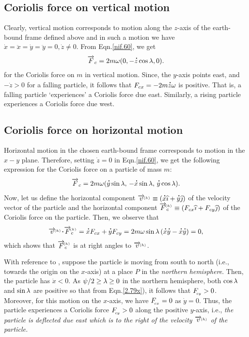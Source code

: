 \subsection{Coriolis force on vertical motion}
 Clearly, 
{vertical motion} corresponds to motion along the $z$-axis 
of the earth-bound frame defined above and in  such a 
motion we have $\dot{x}= \ddot{x}=\dot{y}= \ddot{y}=0, 
\dot{z}\neq 0$. From Eqn.\eqref{nif.60}, we get
\begin{align}
\overrightarrow{F}_{c}=2m{\omega}(0, -{\overset{\hspace*{1.5pt}\centerdot}{z} }\cos{\lambda}, 0).
\end{align}
for the Coriolis force on $m$ in vertical motion. Since, the
$y$-axis points east, and $-\dot{z} >0$ for a falling
particle, it follows that $F_{cx} =-2m{\overset{\hspace*{1.5pt}\centerdot}{z} }{\omega}$ is
positive. That is, {a falling particle `experiences' a 
Coriolis force due east}. Similarly, a rising particle 
experiences a Coriolis force due west.

\subsection{Coriolis force on horizontal motion}
 Horizontal 
motion in the chosen earth-bound frame corresponds to 
motion 
in the $x-y$ plane. Therefore, setting $\dot{z}=0 $ in 
Eqn.\eqref{nif.60}, we get the following expression for the 
Coriolis force on a particle of mass $m$:
\begin{align}\label{2.79x}
\overrightarrow{F}_{c}=2m{\omega}({\overset{\hspace*{1.5pt}\centerdot}{y} }\sin\lambda,\,
-{\overset{\hspace*{1.5pt}\centerdot}{x} }\sin\lambda,\,{\overset{\hspace*{1.5pt}\centerdot}{y} }\cos\lambda).
\end{align}
Now, let us define the horizontal component 
$\overrightarrow{v}^{_{\hspace*{-1.5pt}{(h)}}}\equiv ({\overset{\hspace*{1.5pt}\centerdot}{x} }{\widehat{\imath}} +{\overset{\hspace*{1.5pt}\centerdot}{y} }{\widehat{\jmath}})$ of the 
velocity vector of the particle and the horizontal 
component 
$\overrightarrow{F}^{_{\hspace*{-1.5pt}{(h)}}}_c\equiv (F_{cx}{\widehat{\imath}} +F_{cy}{\widehat{\jmath}})$ of the 
Coriolis force on the particle. Then, we
observe that
\begin{align}
\vec{v}^\sfx{(h)}\dotp \vec{F}^\sfx{(h)}_c =
\dot{x}F_{cx}+\dot{y}F_{cy}=2m\gkw\sin\lambda\, (\dot {x}
\dot{y} -\dot{x}\dot{y})=0,
\end{align}
which shows that $\overrightarrow{F}^{_{\hspace*{-1.5pt}{(h)}}}_{c}$ is
at right angles to $\overrightarrow{v}^{_{\hspace*{-1.5pt}{(h)}}}$.

With reference to , suppose the particle is 
moving from south to north (i.e., towards the origin on the 
$x$-axis) at a place $P$ in the \textsl{northern 
hemisphere}. Then, the particle has $\dot{x}<0$. As 
${\psi}/2\geq{\lambda}\geq 0$ in the northern hemisphere, both 
$\cos{\lambda}$ and $\sin{\lambda}$ are positive so that from 
Eqn.\eqref{2.79x}), it follows that $F_{_{\hspace*{-1.5pt}{cy}}}>0$. 
Moreover, for this motion on the $x$-axis, we have 
$F_{_{\hspace*{-1.5pt}{cx}}}=0$ as $\dot{y}=0$. Thus, the particle 
experiences a Coriolis force $F_{_{\hspace*{-1.5pt}{cy}}}>0$ along the 
positive $y$-axis, i.e., \textsl{the particle is deflected 
due east which is to the right of the velocity 
$\overrightarrow{v}^{_{\hspace*{-1.5pt}{(h)}}}$ of the particle.}


